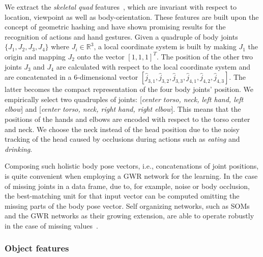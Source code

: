 \documentclass[5p,times]{elsarticle}
\begin{document}
We extract the \textit{skeletal quad} features~\citep{evangelidis2014skeletal}, which are invariant with respect to location, viewpoint as well as body-orientation.
These features are built upon the concept of geometric hashing and have shown promising results for the recognition of actions and hand gestures. 
Given a quadruple of body joints $\{J_1, J_2, J_3, J_4\}$ where $J_i \in \mathbb{R}^3$, a local coordinate system is built by making $J_1$ the origin and mapping $J_2$ onto the vector $[1,1,1]^T$.
The position of the other two joints $J_3$ and $J_4$ are calculated with respect to the local coordinate system and are concatenated in a 6-dimensional vector $[\hat{j}_{3,1}, \hat{j}_{3,2}, \hat{j}_{3,3}, \hat{j}_{4,1}, \hat{j}_{4,2}, \hat{j}_{4,3}]$.
The latter becomes the compact representation of the four body joints' position.
We empirically select two quadruples of joints: [\emph{center torso, neck, left hand, left elbow}] and [\emph{center torso, neck, right hand, right elbow}].
This means that the positions of the hands and elbows are encoded with respect to the torso center and neck.
We choose the neck instead of the head position due to the noisy tracking of the head caused by occlusions during actions such as \textit{eating} and \textit{drinking}.

Composing such holistic body pose vectors, i.e., concatenations of joint positions, is quite convenient when employing a GWR network for the learning.
In the case of missing joints in a data frame, due to, for example, noise or body occlusion, the best-matching unit for that input vector can be computed omitting the missing parts of the body pose vector.
Self organizing networks, such as SOMs and the GWR networks as their growing extension, are able to operate robustly in the case of missing values~\cite{vatanen2015self}.

\subsubsection{Object features}
\end{document}
